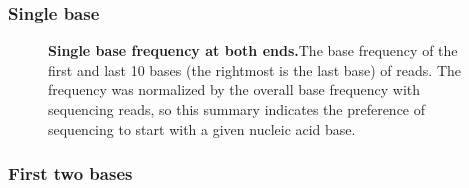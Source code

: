 \documentclass{article}
\begin{document}
\subsubsection{Single base}
\begin{center}
\begin{figure}[h!]
\caption{\textbf{Single base frequency at both ends.}The base frequency of the first and last 10 bases (the rightmost is the last base) of reads. The frequency was normalized by the overall base frequency with sequencing reads, so this summary indicates the preference of sequencing to start with a given nucleic acid base.}
\end{figure}
\end{center}

\subsubsection{First two bases}
\end{document}
